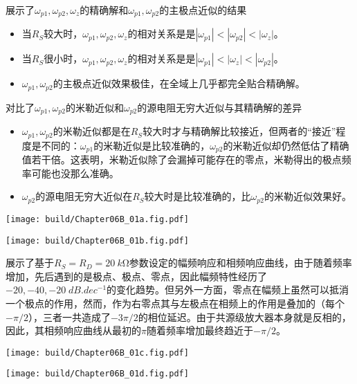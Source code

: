 展示了$\omega_{p1},\omega_{p2},\omega_z$的精确解和$\omega_{p1},\omega_{p2}$的主极点近似的结果
\begin{itemize}
    \item 当$R_S$较大时，$\omega_{p1},\omega_{p2},\omega_z$的相对关系是是$|\omega_{p1}|<|\omega_{p2}|<|\omega_{z}|$。
    \item 当$R_S$很小时，$\omega_{p1},\omega_{p2},\omega_z$的相对关系是是$|\omega_{p1}|<|\omega_{z}|<|\omega_{p2}|$。
    \item $\omega_{p1},\omega_{p2}$的主极点近似效果极佳，在全域上几乎都完全贴合精确解。
\end{itemize}
对比了$\omega_{p1},\omega_{p2}$的米勒近似和$\omega_{p2}$的源电阻无穷大近似与其精确解的差异

\begin{itemize}
    \item $\omega_{p1},\omega_{p2}$的米勒近似都是在$R_S$较大时才与精确解比较接近，但两者的“接近”程度是不同的：$\omega_{p1}$的米勒近似是比较准确的，$\omega_{p2}$的米勒近似却仍然低估了精确值若干倍。这表明，米勒近似除了会漏掉可能存在的零点，米勒得出的极点频率可能也没那么准确。
    \item $\omega_{p2}$的源电阻无穷大近似在$R_S$较大时是比较准确的，比$\omega_{p2}$的米勒近似效果好。
\end{itemize}
\begin{Figure}[共源级放大器的零极点频率]
    \begin{FigureSub}
        \texttt{[image: build/Chapter06B\_01a.fig.pdf]}
    \end{FigureSub}
    \begin{FigureSub}
        \texttt{[image: build/Chapter06B\_01b.fig.pdf]}
    \end{FigureSub}
\end{Figure}

展示了基于$R_S=R_D=\SI{20}{k\ohm}$参数设定的幅频响应和相频响应曲线，由于随着频率增加，先后遇到的是极点、极点、零点，因此幅频特性经历了$-20,-40,-20\;\si{dB.dec^{-1}}$的变化趋势。但另外一方面，零点在幅频上虽然可以抵消一个极点的作用，然而，作为右零点其与左极点在相频上的作用是叠加的（每个$-\pi/2$），三者一共造成了$-3\pi/2$的相位延迟。由于共源级放大器本身就是反相的，因此，其相频响应曲线从最初的$\pi$随着频率增加最终趋近于$-\pi/2$。
\begin{Figure}[共源级放大器的频率响应]
    \begin{FigureSub}
        \texttt{[image: build/Chapter06B\_01c.fig.pdf]}
    \end{FigureSub}
    \begin{FigureSub}
        \texttt{[image: build/Chapter06B\_01d.fig.pdf]}
    \end{FigureSub}
\end{Figure}

